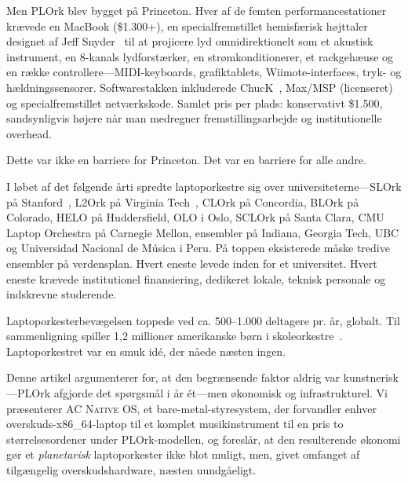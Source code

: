 \documentclass[10pt,letterpaper,twocolumn]{article}
\newcommand{\acos}{\textsc{AC Native OS}}
\begin{document}
Men PLOrk blev bygget p{\aa} Princeton. Hver af de femten performancestationer kr{\ae}vede en MacBook (\$1.300+), en specialfremstillet hemisf{\ae}risk h{\o}jttaler designet af Jeff Snyder~\citep{snyder2015hemispherical} til at projicere lyd omnidirektionelt som et akustisk instrument, en 8-kanals lydforst{\ae}rker, en str{\o}mkonditionerer, et rackgeh{\ae}use og en r{\ae}kke controllere---MIDI-keyboards, grafiktablets, Wiimote-interfaces, tryk- og hældningssensorer. Softwarestakken inkluderede ChucK~\citep{wang2003chuck}, Max/MSP (licenseret) og specialfremstillet netv{\ae}rkskode. Samlet pris per plads: konservativt \$1.500, sandsynligvis h{\o}jere n{\aa}r man medregner fremstillingsarbejde og institutionelle overhead.

Dette var ikke en barriere for Princeton. Det var en barriere for alle andre.

I l{\o}bet af det f{\o}lgende {\aa}rti spredte laptoporkestre sig over universiteterne---SLOrk p{\aa} Stanford~\citep{wang2009designing}, L2Ork p{\aa} Virginia Tech~\citep{bukvic2010l2ork}, CLOrk p{\aa} Concordia, BLOrk p{\aa} Colorado, HELO p{\aa} Huddersfield, OLO i Oslo, SCLOrk p{\aa} Santa Clara, CMU Laptop Orchestra p{\aa} Carnegie Mellon, ensembler p{\aa} Indiana, Georgia Tech, UBC og Universidad Nacional de M\'{u}sica i Peru. P{\aa} toppen eksisterede m{\aa}ske tredive ensembler p{\aa} verdensplan. Hvert eneste levede inden for et universitet. Hvert eneste kr{\ae}vede institutionel finansiering, dedikeret lokale, teknisk personale og indskrevne studerende.

Laptoporkesterbev{\ae}gelsen toppede ved ca. 500--1.000 deltagere pr. {\aa}r, globalt. Til sammenligning spiller 1,2 millioner amerikanske b{\o}rn i skoleorkestre~\citep{warschauer2004technology}. Laptoporkestret var en smuk id\'{e}, der n{\aa}ede n{\ae}sten ingen.

Denne artikel argumenterer for, at den begr{\ae}nsende faktor aldrig var kunstnerisk---PLOrk afgjorde det sp{\o}rgsm{\aa}l i {\aa}r \'{e}t---men {\o}konomisk og infrastrukturel. Vi pr{\ae}senterer \acos{}, et bare-metal-styresystem, der forvandler enhver overskuds-x86\_64-laptop til et komplet musikinstrument til en pris to st{\o}rrelsesordener under PLOrk-modellen, og foresl{\aa}r, at den resulterende {\o}konomi g{\o}r et \emph{planetarisk} laptoporkester ikke blot muligt, men, givet omfanget af tilg{\ae}ngelig overskudshardware, n{\ae}sten uundg{\aa}eligt.

\end{document}

